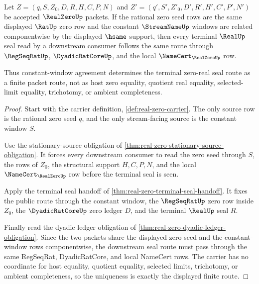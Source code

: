 \begin{theorem}
\label{thm:real-zero-constant-window-uniqueness}
Let $Z=(q,S,Z_0,D,R,H,C,P,N)$ and $Z'=(q',S',Z'_0,D',R',H',C',P',N')$ be accepted $\RealZeroUp$ packets. If the rational zero seed rows are the same displayed $\RatUp$ zero row and the constant $\StreamNameUp$ windows are related componentwise by the displayed $\hsame$ support, then every terminal $\RealUp$ seal read by a downstream consumer follows the same route through $\RegSeqRatUp$, $\DyadicRatCoreUp$, and the local $\NameCert_{\RealZeroUp}$ row.

Thus constant-window agreement determines the terminal zero-real seal route as a finite packet route, not as host zero equality, quotient real equality, selected-limit equality, trichotomy, or ambient completeness.
\end{theorem}
\begin{proof}
Start with the carrier definition, \autoref{def:real-zero-carrier}. The only source row is the rational zero seed $q$, and the only stream-facing source is the constant window $S$.

Use the stationary-source obligation of \autoref{thm:real-zero-stationary-source-obligation}. It forces every downstream consumer to read the zero seed through $S$, the rows of $Z_0$, the structural support $H,C,P,N$, and the local $\NameCert_{\RealZeroUp}$ row before the terminal seal is seen.

Apply the terminal seal handoff of \autoref{thm:real-zero-terminal-seal-handoff}. It fixes the public route through the constant window, the $\RegSeqRatUp$ zero row inside $Z_0$, the $\DyadicRatCoreUp$ zero ledger $D$, and the terminal $\RealUp$ seal $R$.

Finally read the dyadic ledger obligation of \autoref{thm:real-zero-dyadic-ledger-obligation}. Since the two packets share the displayed zero seed and the constant-window rows componentwise, the downstream seal route must pass through the same RegSeqRat, DyadicRatCore, and local NameCert rows. The carrier has no coordinate for host equality, quotient equality, selected limits, trichotomy, or ambient completeness, so the uniqueness is exactly the displayed finite route.
\end{proof}

